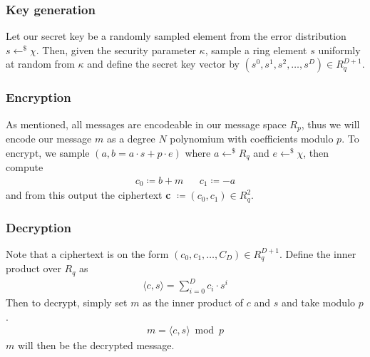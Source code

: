 \documentclass[../main.tex]{subfiles}
\begin{document}
\subsubsection{Key generation}
Let our secret key be a randomly sampled element from the error distribution $s \leftarrow^\$ \chi$.
Then, given the security parameter $\kappa$, sample a ring element $s$ uniformly at random from $\kappa$ and define the
secret key vector by $(s^0, s^1, s^2, \dots, s^D) \in R_q^{D+1}$.

\subsubsection{Encryption}
As mentioned, all messages are encodeable in our message space $R_p$, thus we will encode our message $m$ as a degree $N$
polynomium with coefficients modulo $p$.
To encrypt, we sample $(a, b = a \cdot s + p \cdot e)$ where $a \leftarrow^\$ R_q$ and $e \leftarrow^\$ \chi$,
then compute
\begin{align*}
    c_0 \coloneqq b + m &  & c_1 \coloneqq -a
\end{align*}
and from this output the ciphertext \textbf{c} $\coloneqq (c_0, c_1) \in R_q^2$.

\subsubsection{Decryption}
Note that a ciphertext is on the form $(c_0, c_1, \dots , C_{D}) \in R_q^{D+1}$.
Define the inner product over $R_q$ as
\begin{align*}
    \langle c, s \rangle = \sum_{i=0}^{D} c_i \cdot s^i
\end{align*}
Then to decrypt, simply set $m$ as the inner product of $c$ and $s$ and take modulo $p$.
\begin{align*}
    m = \langle c, s \rangle \bmod p
\end{align*}
$m$ will then be the decrypted message.
\end{document}
